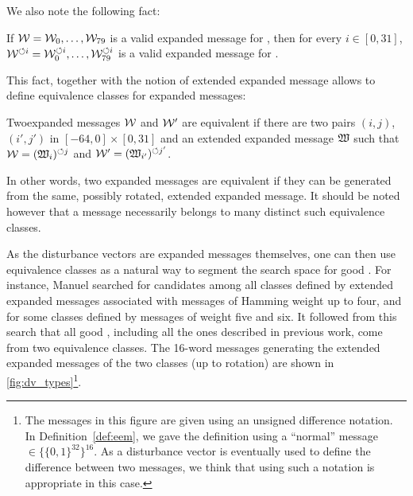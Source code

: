 We also note the following fact:
\begin{fact}
If $\expmess = \expmess_0, \ldots,\linebreak \expmess_{79}$ is a valid expanded message for \shaone, then for every $i \in [0, 31]$, $\mathcal{W}^{\circlearrowleft i} =
\mathcal{W}_0^{\circlearrowleft i}, \ldots, \mathcal{W}_{79}^{\circlearrowleft i}$ is a valid expanded message for \shaone.
\end{fact}
This fact, together with the notion of extended expanded message allows to define equivalence classes for expanded messages:
\begin{defi}
Two\linebreak \shaone expanded messages $\mathcal{W}$ and $\mathcal{W}'$ are equivalent if there are two pairs $(i,j)$, $(i',j')$ in $[-64, 0] \times [0, 31]$
and an extended expanded message $\mathfrak{W}$ such that $\mathcal{W} = (\mathfrak{W}_i)^{\circlearrowleft j}$ and $\mathcal{W}' = (\mathfrak{W}_{i'})^{\circlearrowleft j'}$.
\end{defi}
In other words, two expanded messages are equivalent if they can be generated from the same, possibly rotated, extended expanded message. It should be noted
however that a message necessarily belongs to many distinct such equivalence classes.

As the disturbance vectors are expanded messages themselves, one can then use equivalence classes as a natural way to segment the search space for good \dvs. For instance,
Manuel searched for candidates among all classes defined by extended expanded messages associated with messages of Hamming weight up to four, and for some classes defined by
messages of weight five and six. It followed from this search that all good \dvs, including all the ones described in previous work, come from two equivalence classes.
The 16-word messages generating the extended expanded messages of the two classes (up to rotation) are shown in \autoref{fig:dv_types}\footnote{The messages in this
figure are given using an unsigned difference notation. In Definition~\ref{def:eem}, we gave the definition using a ``normal'' message $\in \{\{0,1\}^{32}\}^{16}$. As
a disturbance vector is eventually used to define the difference between two messages, we think that using such a notation is appropriate in this case.}.

